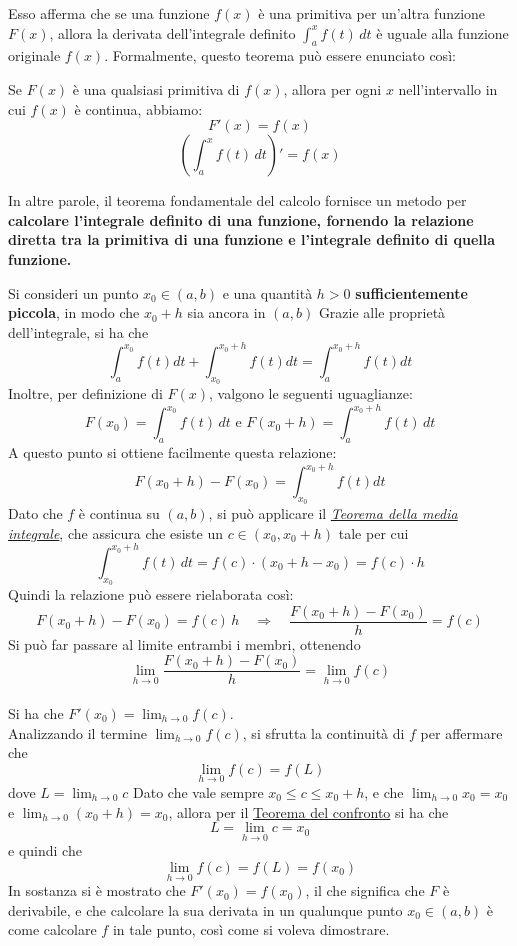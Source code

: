 \documentclass{article}
\begin{document}
Esso afferma che se una funzione $f(x)$ è una primitiva per un'altra funzione
$F(x)$, allora la derivata dell'integrale definito $\int_a^x f(t) \, dt$ è
uguale alla funzione originale $f(x)$. Formalmente, questo teorema può essere
enunciato così:

Se $F(x)$ è una qualsiasi primitiva di $f(x)$, allora per ogni $x$
nell'intervallo in cui $f(x)$ è continua, abbiamo: $$ F'(x) = f(x) $$ $$ \left(
    \int_a^x f(t) \, dt \right)' = f(x) $$

In altre parole, il teorema fondamentale del calcolo fornisce un metodo per
\textbf{calcolare l'integrale definito di una funzione, fornendo la relazione
    diretta tra la primitiva di una funzione e l'integrale definito di quella
    funzione.}

Si consideri un punto $x_0 \in (a,b)$ e una quantità $h > 0$ \textbf{sufficientemente
piccola}, in modo che $x_0 + h$ sia ancora in $(a,b)$ Grazie alle proprietà
dell'integrale, si ha che $$\int_a^{x_0} f(t)dt + \int_{x_0}^{x_0+h} f(t)dt =
    \int_a^{x_0+h}f(t)dt$$ Inoltre, per definizione di $F(x)$, valgono le seguenti
uguaglianze:$$F(x_0) = \int_a^{x_0} f(t) \, dt \text{ e } F(x_0 + h) =
    \int_a^{x_0+h}f(t) \, dt$$ A questo punto si ottiene facilmente questa
relazione: $$F(x_0+h) - F(x_0) = \int_{x_0}^{x_0 + h}f(t)dt$$ Dato che $f$ è
continua su $(a,b)$, si può applicare il \textit{\underline{Teorema della media
        integrale}}, che assicura che esiste un $c \in (x_0, x_0 + h)$ tale per cui
$$\int_{x_0}^{x_0 + h}f(t) \, dt = f(c) \cdot (x_0 +h - x_0) = f(c) \cdot
    h$$Quindi la relazione può essere rielaborata così: $$F(x_0+h) - F(x_0) = f(c)
    \, h \quad \Rightarrow \quad \frac{F(x_0+h) - F(x_0)}{h} = f(c)$$ Si può far
passare al limite entrambi i membri, ottenendo$$\lim_{h \to 0} \frac{F(x_0+h) -
        F(x_0)}{h} = \lim_{h \to 0}f(c)$$\\ Si ha che $F'(x_0) = \lim_{h \to
        0}f(c)$.\\Analizzando il termine $\lim_{h \to 0}f(c)$, si sfrutta la continuità
di $f$ per affermare che $$\lim_{h \to 0}f(c) = f(L)$$ dove $L = \lim_{h \to
        0}c$ Dato che vale sempre $x_0 \leq c \leq x_0 + h$, e che $\lim_{h \to 0}x_0 =
    x_0$ e $\lim_{h \to 0} ( x_0 + h )= x_0$, allora per il \underline{Teorema del
    confronto} si ha che \[L = \lim_{h \to 0}c = x_0\] e quindi che \[\lim_{h \to 0}f(c) = f(L) = f(x_0)\]
In sostanza si è mostrato che $F'(x_0) = f(x_0)$, il che significa che $F$ è
derivabile, e che calcolare la sua derivata in un qualunque punto $x_0 \in
    (a,b)$ è come calcolare $f$ in tale punto, così come si voleva dimostrare.
\end{document}
